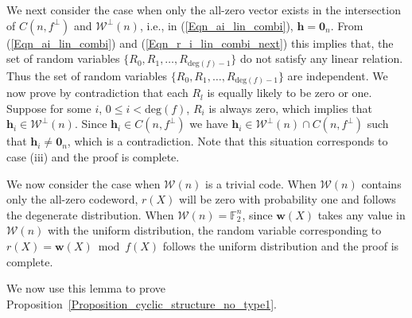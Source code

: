 \documentclass[10pt,journal]{IEEEtran}
\def \deg{{\mathrm{deg}}}
\begin{document}
\begin{IEEEproof}
We next consider the case when only the all-zero vector exists in the intersection of $C(n,f^{\perp})$ and 
$\mathcal{W}^{\perp}(n)$, i.e., in (\ref{Eqn_ai_lin_combi}), $\mathbf{h} = \mathbf{0}_n$.
From (\ref{Eqn_ai_lin_combi}) and (\ref{Eqn_r_i_lin_combi_next}) this implies that, the set of 
random variables $\{ R_0, R_1, \ldots, R_{\deg(f)-1} \}$ do not satisfy any linear relation.
Thus the set of random variables $\{ R_0, R_1, \ldots, R_{\deg(f)-1} \}$ are independent.
% 
We now prove by contradiction that each $R_l$ is equally likely to be zero or one.
Suppose for some $i$, $0 \leq i < \deg(f)$, $R_i$ is always zero, which
implies that $\mathbf{h}_i \in \mathcal{W}^{\perp}(n)$.
Since $\mathbf{h}_i \in C(n,f^{\perp})$ we have $\mathbf{h}_i \in \mathcal{W}^{\perp}(n) \cap C(n,f^{\perp})$
such that $\mathbf{h}_i \neq \mathbf{0}_n$, which is a contradiction.
% 
Note that this situation corresponds to case (iii) and the proof is complete.

We now consider the case when $\mathcal{W}(n)$ is a trivial code. 
When $\mathcal{W}(n)$ contains only the all-zero codeword, $r(X)$ will be zero with probability one and follows 
the degenerate distribution.
When $\mathcal{W}(n) = \mathbb{F}_2^n$, since $\mathbf{w}(X)$ takes any value in $\mathcal{W}(n)$
with the uniform distribution, the random variable corresponding to $r(X) = \mathbf{w}(X) \bmod f(X)$ 
follows the uniform distribution and the proof is complete.
% 
\end{IEEEproof}
% 
We now use this lemma to prove Proposition~\ref{Proposition_cyclic_structure_no_type1}.
\end{document}
